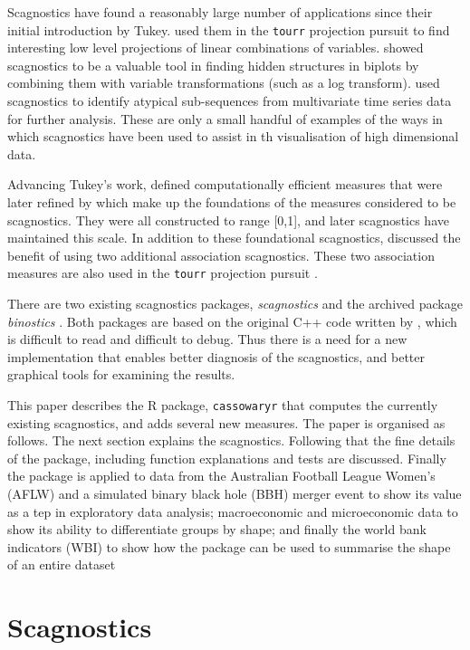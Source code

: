 Scagnostics have found a reasonably large number of applications since
their initial introduction by Tukey. \citet{tourrpp} used them in the
\texttt{tourr} projection pursuit to find interesting low level
projections of linear combinations of variables. \citet{hidscags} showed
scagnostics to be a valuable tool in finding hidden structures in
biplots by combining them with variable transformations (such as a log
transform). \citet{timeseer} used scagnostics to identify atypical
sub-sequences from multivariate time series data for further analysis.
These are only a small handful of examples of the ways in which
scagnostics have been used to assist in th visualisation of high
dimensional data.

Advancing Tukey's work, \citet{scag} defined computationally efficient
measures that were later refined by \citet{scagdist} which make up the
foundations of the measures considered to be scagnostics. They were all
constructed to range {[}0,1{]}, and later scagnostics have maintained
this scale. In addition to these foundational scagnostics, \citet{Grimm}
discussed the benefit of using two additional association scagnostics.
These two association measures are also used in the \texttt{tourr}
projection pursuit \citep{tourrpp}.

There are two existing scagnostics packages, \emph{scagnostics}
\citep{scagdist} and the archived package \emph{binostics}
\citep{binostics}. Both packages are based on the original C++ code
written by \citet{scagdist}, which is difficult to read and difficult to
debug. Thus there is a need for a new implementation that enables better
diagnosis of the scagnostics, and better graphical tools for examining
the results.

This paper describes the R package, \texttt{cassowaryr} that computes
the currently existing scagnostics, and adds several new measures. The
paper is organised as follows. The next section explains the
scagnostics. Following that the fine details of the package, including
function explanations and tests are discussed. Finally the package is
applied to data from the Australian Football League Women's (AFLW) and a
simulated binary black hole (BBH) merger event to show its value as a
tep in exploratory data analysis; macroeconomic and microeconomic data
to show its ability to differentiate groups by shape; and finally the
world bank indicators (WBI) to show how the package can be used to
summarise the shape of an entire dataset

\hypertarget{scagnostics}{%
\section{Scagnostics}\label{scagnostics}}

